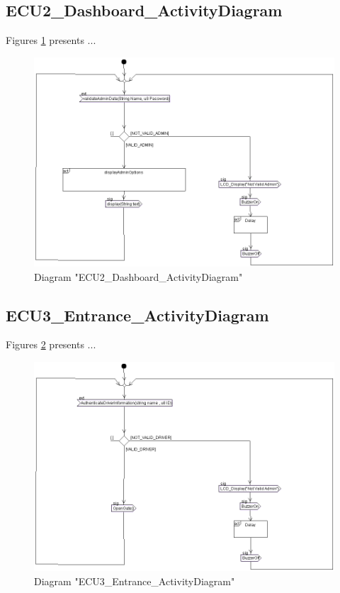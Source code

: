 \subsection{ECU2\_Dashboard\_ActivityDiagram}
Figures \ref{fig:ECU2DashboardActivityDiagramECU2DashboardActivityDiagram01} presents ...
\begin{figure}[htb]
\centering
\includegraphics[width=\textwidth]{img_0_1.png}
\caption{Diagram "ECU2\_Dashboard\_ActivityDiagram"}
\label{fig:ECU2DashboardActivityDiagramECU2DashboardActivityDiagram01}
\end{figure}

\subsection{ECU3\_Entrance\_ActivityDiagram}
Figures \ref{fig:ECU3EntranceActivityDiagramECU3EntranceActivityDiagram02} presents ...
\begin{figure}[htb]
\centering
\includegraphics[width=\textwidth]{img_0_2.png}
\caption{Diagram "ECU3\_Entrance\_ActivityDiagram"}
\label{fig:ECU3EntranceActivityDiagramECU3EntranceActivityDiagram02}
\end{figure}

